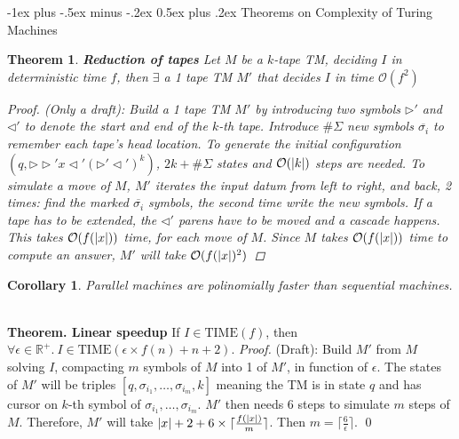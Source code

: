 \documentclass[10pt,landscape]{article}
\makeatletter
\newcommand{\bumper}{\triangleright}
\newcommand{\R}{\mathbb{R}}
\newcommand{\TIME}{\mathrm{TIME}}
\renewcommand{\O}{\mathcal{O}}
\DeclarePairedDelimiter\abs{\lvert}{\rvert}
\theoremstyle{plain}%
\newtheorem*{thm}{Theorem}
\newtheorem*{cor}{Corollary}
\theoremstyle{definition}
\theoremstyle{remark}
\renewcommand{\section}{\@startsection{section}{1}{0mm}%
                                {-1ex plus -.5ex minus -.2ex}%
                                {0.5ex plus .2ex}%
                                {\normalfont\large\bfseries}}
\makeatother
\begin{document}
\begin{multicols}{3}
\section{Theorems on Complexity of Turing Machines}


\begin{thm} \textbf{Reduction of tapes}
    Let $M$ be a $k$-tape TM, deciding $I$ in deterministic time $f$,
    then $\exists$ a 1 tape TM $M'$ that decides $I$ in time $\O(f^2)$


    \begin{proof} (Only a draft):
        Build a 1 tape TM $M'$ by introducing two symbols $\bumper'$ and
        $\triangleleft'$ to denote the start and end of the $k$-th tape.
        Introduce $\#\Sigma$ new symbols $\overline{\sigma_i}$ to remember
        each tape's head location.
        To generate the initial configuration $(q, \bumper \bumper' x \triangleleft' (\bumper' \triangleleft' )^k )$,
        $2k + \#\Sigma$ states and $\O(\abs{k})$ steps are needed.
        To simulate a move of $M$, $M'$ iterates the input datum from left to right, and back,
        2 times: find the marked $\overline{\sigma_i}$ symbols, the second time write the new
        symbols. If a tape has to be extended, the $\triangleleft'$ parens have to be moved 
        and a cascade happens. This takes $\O(f(\abs{x}))$ time, for each move of $M$. Since
        $M$ takes $\O(f(\abs{x}))$ time to compute an answer, $M'$ will take $\O(f(\abs{x})^2)$
    \end{proof}
\end{thm}

\begin{cor}
    Parallel machines are polinomially faster than sequential machines.
\end{cor}
 \\[.2cm]


\textbf{Theorem. Linear speedup}
If $I \in \TIME(f)$, then $\forall \epsilon \in \R^+  . \ I \in \TIME(\epsilon \times f(n) + n + 2)$.
\textit{Proof.}
        (Draft): Build $M'$ from $M$ solving $I$, compacting $m$ symbols of $M$ into 1 of $M'$, in function of $\epsilon$.
        The states of $M'$ will be triples $[q,\sigma_{i_1},\hdots,\sigma_{i_m},k]$ meaning the TM is in state $q$
        and has cursor on $k$-th symbol of $\sigma_{i_1},\hdots,\sigma_{i_m}$. $M'$ then needs 6 steps to simulate
        $m$ steps of $M$. Therefore, $M'$ will take $\abs{x} + 2 + 6 \times \lceil \frac{f(\abs{x})}{m}\rceil$. 
        Then $m = \lceil \frac{6}{\epsilon} \rceil$.
        \qed \\[.2cm]


\end{multicols}
\end{document}
